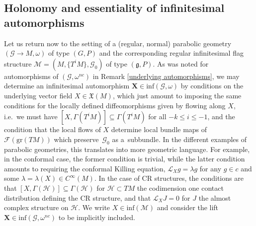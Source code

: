 \documentclass[11pt]{article}
\def\g{\mathfrak{g}}
\def\Gbdle{\mathcal{G}}
\def\VF{\mathfrak{X}}
\def\Lie{\mathcal{L}}
\theoremstyle{plain}
\theoremstyle{definition}
\begin{document}
\subsection{Holonomy and essentiality of inf\/initesimal automorphisms}\label{section4.2}

Let us return now to the setting of a (regular, normal) parabolic geometry $(\Gbdle \rightarrow M,\omega)$ of type $(G,P)$ and the corresponding regular inf\/initesimal f\/lag structure $\mathcal{M} = (M,\{T^iM\},\Gbdle_0)$ of type $(\g,P)$. As was noted for automorphisms of $(\Gbdle,\omega^{nc})$ in Remark \ref{underlying automorphisms}, we may determine an inf\/initesimal automorphism $\mathbf{X} \in \mathrm{inf}(\Gbdle,\omega)$ by conditions on the underlying vector f\/ield $X \in \VF(M)$, which just amount to imposing the same conditions for the locally def\/ined dif\/feomorphisms given by f\/lowing along $X$, i.e.\ we must have $[X,\Gamma(T^iM)] \subseteq \Gamma(T^iM)$ for all $-k \leq i \leq -1$, and the condition that the local f\/lows of $X$ determine local bundle maps of $\mathcal{F}(\mathrm{gr}(TM))$ which preserve~$\Gbdle_0$ as a~subbundle. In the dif\/ferent examples of parabolic geometries, this translates into more geometric language. For example, in the conformal case, the former condition is trivial, while the latter condition amounts to requiring the conformal Killing equation, $\Lie_X g = \lambda g$ for any $g \in c$ and some $\lambda = \lambda(X) \in C^{\infty}(M)$. In the case of CR structures, the conditions are that $[X,\Gamma(\mathcal{H})] \subseteq \Gamma(\mathcal{H})$ for $\mathcal{H} \subset TM$ the codimension one contact distribution def\/ining the CR structure, and that $\Lie_X J = 0$ for $J$ the almost complex structure on $\mathcal{H}$. We write $X \in \mathrm{inf}(\mathcal{M})$ and consider the lift $\mathbf{X} \in \mathrm{inf}(\Gbdle,\omega^{nc})$ to be implicitly included.
\end{document}
